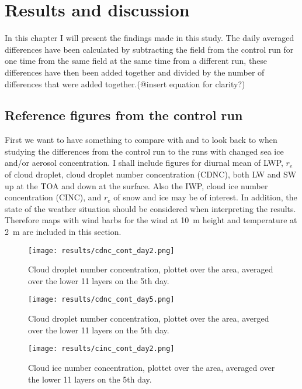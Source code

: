 \chapter{Results and discussion}
\label{chap:results}
In this chapter I will present the findings made in this study.  The daily averaged differences have been calculated by subtracting the field from the control run for one time from the same field at the same time from a different run, these differences have then been added together and divided by the number of differences that were added together.(@insert equation for clarity?)

\section{Reference figures from the control run}
First we want to have something to compare with and to look back to when studying the differences from the control run to the runs with changed sea ice and/or aerosol concentration. I shall include figures for diurnal mean of LWP, $r_e$ of cloud droplet, cloud droplet number concentration (CDNC), both LW and SW up at the TOA and down at the surface. Also the IWP, cloud ice number concentration (CINC), and $r_e$ of snow and ice may be of interest. In addition, the state of the weather situation should be considered when interpreting the results. Therefore maps with wind barbs for the wind at 10~m height and temperature at 2~m are included in this section.

\begin{figure}
\centering
\texttt{[image: results/cdnc\_cont\_day2.png]}
\caption{Cloud droplet number concentration, plottet over the area, averaged over the lower 11 layers on the 5th day.}
\label{fig:cdnc_cont_Day2}
\end{figure}

\begin{figure}
\centering
\texttt{[image: results/cdnc\_cont\_day5.png]}
\caption{Cloud droplet number concentration, plottet over the area, averged over the lower 11 layers on the 5th day.}
\label{fig:cdnc_cont_Day5}
\end{figure}

\begin{figure}
\centering
\texttt{[image: results/cinc\_cont\_day2.png]}
\caption{Cloud ice number concentration, plottet over the area, averaged over the lower 11 layers on the 5th day.}
\label{fig:cinc_cont_Day2}
\end{figure}

